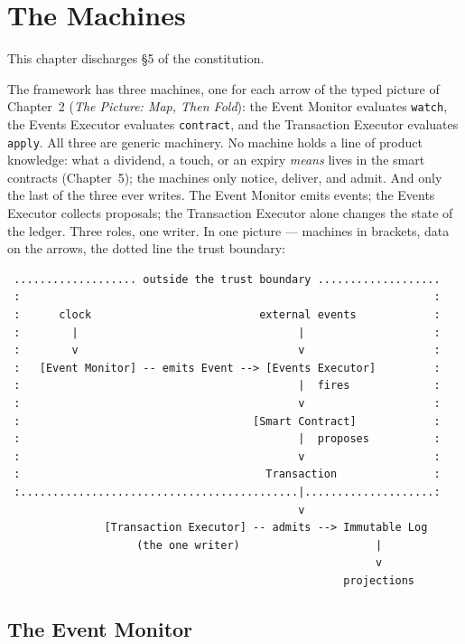 \section{The Machines}\label{ch:machines}

This chapter discharges \S5 of the constitution.

The framework has three machines, one for each arrow of the typed picture of
Chapter~2 (\emph{The Picture: Map, Then Fold}): the Event Monitor evaluates
\texttt{watch}, the Events Executor evaluates \texttt{contract}, and the
Transaction Executor evaluates \texttt{apply}. All three are generic machinery.
No machine holds a line of product knowledge: what a dividend, a touch, or an
expiry \emph{means} lives in the smart contracts (Chapter~5); the machines only
notice, deliver, and admit. And only the last of the three ever writes. The
Event Monitor emits events; the Events Executor collects proposals; the
Transaction Executor alone changes the state of the ledger. Three roles, one
writer. In one picture --- machines in brackets, data on the arrows, the dotted
line the trust boundary:

{\small
\begin{verbatim}
 ................... outside the trust boundary ...................
 :                                                                :
 :      clock                          external events            :
 :        |                                  |                    :
 :        v                                  v                    :
 :   [Event Monitor] -- emits Event --> [Events Executor]         :
 :                                           |  fires             :
 :                                           v                    :
 :                                    [Smart Contract]            :
 :                                           |  proposes          :
 :                                           v                    :
 :                                      Transaction               :
 :...........................................|....................:
                                             v
               [Transaction Executor] -- admits --> Immutable Log
                    (the one writer)                     |
                                                         v
                                                    projections
\end{verbatim}
}

\subsection{The Event Monitor}

